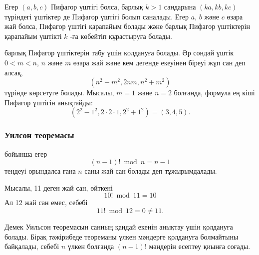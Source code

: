 Егер $(a,b,c)$ Пифагор үштігі болса, барлық $k>1$ сандарына
$(ka,kb,kc)$ түріндегі үштіктер де Пифагор үштігі болып саналады.
Егер $a$, $b$ және $c$ өзара жай болса, Пифагор үштігі қарапайым болады және барлық Пифагор үштіктерін қарапайым үштікті $k$ -ға көбейтіп құрастыруға болады. 


 барлық Пифагор үштіктерін табу үшін
қолдануға болады.
Әр сондай үштік $0<m<n$, $n$ және $m$ өзара жай және 
кем дегенде екеуінен біреуі жұп сан деп алсақ, 
\[(n^2-m^2,2nm,n^2+m^2)\] түрінде көрсетуге болады.
Мысалы, $m=1$ және $n=2$ болғанда, формула ең кіші Пифагор үштігін
анықтайды:
\[(2^2-1^2,2\cdot2\cdot1,2^2+1^2)=(3,4,5).\]


\subsubsection{Уилсон теоремасы}


 бойынша
егер 
\[(n-1)! \bmod n = n-1\] теңдеуі орындалса ғана $n$ саны жай сан болады деп тұжырымдалады. 

Мысалы, 11 деген жай сан, өйткені
\[10! \bmod 11 = 10\]
Ал 12 жай сан емес, себебі
\[11! \bmod 12 = 0 \neq 11.\]

Демек Уильсон теоремасын санның қандай екенін анықтау
үшін қолдануға болады.
Бірақ тәжірибеде теореманы үлкен мәндерге қолдануға болмайтыны байқалады,
себебі $n$ үлкен болғанда $(n-1)!$ мәндерін есептеу қиынға соғады.


